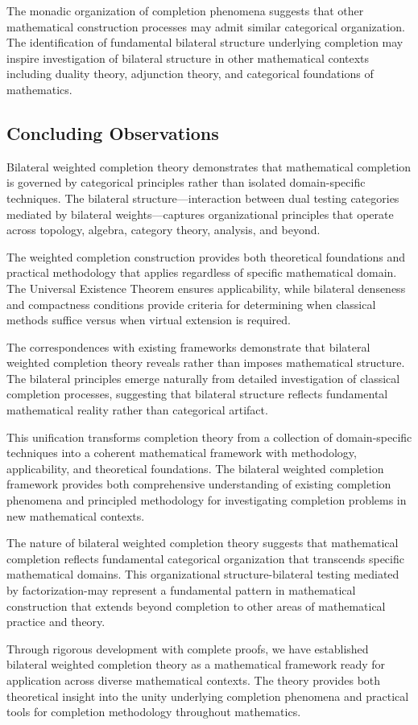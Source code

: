 \documentclass[11pt]{article}
\theoremstyle{plain}
\theoremstyle{definition}
\theoremstyle{remark}
\begin{document}
The monadic organization of completion phenomena suggests that other mathematical construction processes may admit similar categorical organization. The identification of fundamental bilateral structure underlying completion may inspire investigation of bilateral structure in other mathematical contexts including duality theory, adjunction theory, and categorical foundations of mathematics.

\subsection{Concluding Observations}

Bilateral weighted completion theory demonstrates that mathematical completion is governed by categorical principles rather than isolated domain-specific techniques. The bilateral structure---interaction between dual testing categories mediated by bilateral weights---captures organizational principles that operate across topology, algebra, category theory, analysis, and beyond.

The weighted completion construction provides both theoretical foundations and practical methodology that applies regardless of specific mathematical domain. The Universal Existence Theorem ensures applicability, while bilateral denseness and compactness conditions provide criteria for determining when classical methods suffice versus when virtual extension is required.

The correspondences with existing frameworks demonstrate that bilateral weighted completion theory reveals rather than imposes mathematical structure. The bilateral principles emerge naturally from detailed investigation of classical completion processes, suggesting that bilateral structure reflects fundamental mathematical reality rather than categorical artifact.

This unification transforms completion theory from a collection of domain-specific techniques into a coherent mathematical framework with methodology, applicability, and theoretical foundations. The bilateral weighted completion framework provides both comprehensive understanding of existing completion phenomena and principled methodology for investigating completion problems in new mathematical contexts.

The nature of bilateral weighted completion theory suggests that mathematical completion reflects fundamental categorical organization that transcends specific mathematical domains. This organizational structure-bilateral testing mediated by factorization-may represent a fundamental pattern in mathematical construction that extends beyond completion to other areas of mathematical practice and theory.

Through rigorous development with complete proofs, we have established bilateral weighted completion theory as a mathematical framework ready for application across diverse mathematical contexts. The theory provides both theoretical insight into the unity underlying completion phenomena and practical tools for completion methodology throughout mathematics.


\end{document}
